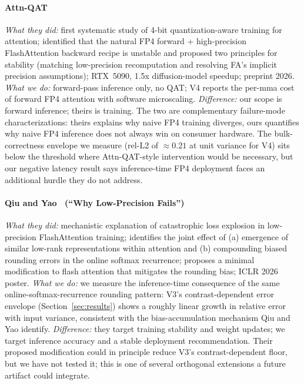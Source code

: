 \documentclass[conference]{IEEEtran}
\begin{document}
\paragraph*{Attn-QAT~\cite{zhang2026attnqat}}
\emph{What they did:} first systematic study of 4-bit
quantization-aware training for attention; identified that the
natural FP4 forward + high-precision FlashAttention backward recipe
is unstable and proposed two principles for stability (matching
low-precision recomputation and resolving FA's implicit precision
assumptions); RTX~5090, 1.5x diffusion-model speedup; preprint 2026.
\emph{What we do:} forward-pass inference only, no QAT; V4 reports
the per-mma cost of forward FP4 attention with software
microscaling. \emph{Difference:} our scope is forward inference;
theirs is training. The two are complementary failure-mode
characterizations: theirs explains why naive FP4 training diverges,
ours quantifies why naive FP4 inference does not always win on
consumer hardware. The bulk-correctness envelope we measure
(rel-L2 of $\approx 0.21$ at unit variance for V4) sits below the
threshold where Attn-QAT-style intervention would be necessary, but
our negative latency result says inference-time FP4 deployment
faces an additional hurdle they do not address.

\paragraph*{Qiu and Yao~\cite{qiu2025lowprecisionfails} (``Why Low-Precision Fails'')}
\emph{What they did:} mechanistic explanation of catastrophic loss
explosion in low-precision FlashAttention training; identifies the
joint effect of (a) emergence of similar low-rank representations
within attention and (b) compounding biased rounding errors in the
online softmax recurrence; proposes a minimal modification to flash
attention that mitigates the rounding bias; ICLR 2026 poster.
\emph{What we do:} we measure the inference-time consequence of the
same online-softmax-recurrence rounding pattern: V3's
contrast-dependent error envelope (Section~\ref{sec:results}) shows
a roughly linear growth in relative error with input variance,
consistent with the bias-accumulation mechanism Qiu and Yao
identify. \emph{Difference:} they target training stability and
weight updates; we target inference accuracy and a stable
deployment recommendation. Their proposed modification could in
principle reduce V3's contrast-dependent floor, but we have not
tested it; this is one of several orthogonal extensions a future
artifact could integrate.
\end{document}
